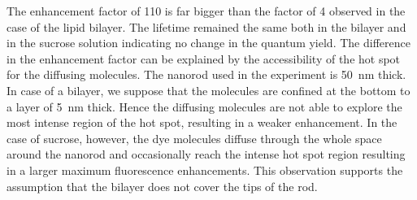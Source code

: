 The enhancement factor of 110 is far bigger than the factor of 4 observed in the case of the lipid bilayer. 
The lifetime remained the same both in the bilayer and in the sucrose solution indicating no change in the quantum yield.
The difference in the enhancement factor can be explained by the accessibility of the hot spot for the diffusing molecules.
The nanorod used in the experiment is \SI{50}{\nm} thick.
In case of a bilayer, we suppose that the molecules are confined at the bottom to a layer of \SI{5}{\nm} thick.
Hence the diffusing molecules are not able to explore the most intense region of the hot spot, resulting in a weaker enhancement.
In the case of sucrose, however, the dye molecules diffuse through the whole space around the nanorod and occasionally reach the intense hot spot region resulting in a larger maximum fluorescence enhancements.
This observation supports the assumption that the bilayer does not cover the tips of the rod.

